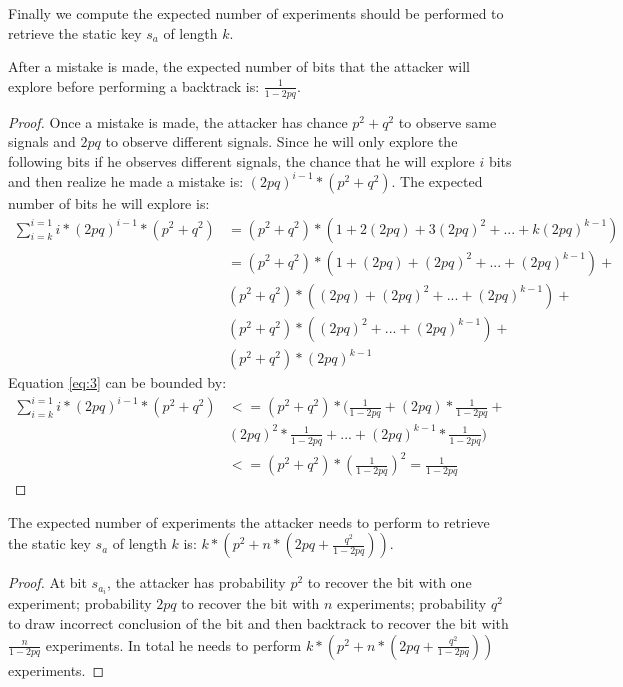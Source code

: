 \documentclass{iacrtrans}
\begin{document}
Finally we compute the expected number of experiments should be performed to retrieve the static key $s_a$ of length $k$. 
\begin{lemma}
After a mistake is made, the expected number of bits that the attacker will explore before performing a backtrack is: $\frac{1}{1-2pq}$. 
\end{lemma}
\begin{proof}
Once a mistake is made, the attacker has chance $p^2+q^2$ to observe same signals and $2pq$ to observe different signals. Since he will only explore the following bits if he observes different signals, the chance that he will explore $i$ bits and then realize he made a mistake is: $(2pq)^{i-1}*(p^2+q^2)$. The expected number of bits he will explore is: 
\begin{equation} \label{eq:3}
\begin{split}
    \sum_{i=k}^{i=1} i*(2pq)^{i-1}*(p^2+q^2) & = (p^2+q^2) * (1 + 2(2pq) + 3(2pq)^2 + ... + k(2pq)^{k-1} )\\
                                             & = (p^2+q^2)*(1 + (2pq) + (2pq)^2 + ... + (2pq)^{k-1} ) + \\
                                             &   (p^2+q^2)*( (2pq) + (2pq)^2 + ... + (2pq)^{k-1} ) + \\
                                             &   (p^2+q^2)*( (2pq)^2 + ... + (2pq)^{k-1}) + \\
                                             &   (p^2+q^2) * (2pq)^{k-1}
\end{split}
\end{equation}
Equation \ref{eq:3} can be bounded by:
\begin{equation} \label{eq:4}
\begin{split}
\sum_{i=k}^{i=1} i*(2pq)^{i-1}*(p^2+q^2) & <= (p^2+q^2) * (\frac{1}{1-2pq} + (2pq)*\frac{1}{1-2pq} + \\
                                         &(2pq)^2*\frac{1}{1-2pq} + ... + (2pq)^{k-1}*\frac{1}{1-2pq})\\
                                         & <= (p^2+q^2) * (\frac{1}{1-2pq})^2 = \frac{1}{1-2pq}
\end{split}
\end{equation}
\end{proof}

\begin{lemma}
The expected number of experiments the attacker needs to perform to retrieve the static key $s_a$ of length $k$ is: $k*(p^2+n*(2pq+\frac{q^2}{1-2pq}))$.
\end{lemma}
\begin{proof}
At bit $s_{a_i}$, the attacker has probability $p^2$ to recover the bit with one experiment; probability $2pq$ to recover the bit with $n$ experiments; probability $q^2$ to draw incorrect conclusion of the bit and then backtrack to recover the bit with $\frac{n}{1-2pq}$ experiments. In total he needs to perform $k*(p^2+n*(2pq+\frac{q^2}{1-2pq}))$ experiments.
\end{proof}
\end{document}
